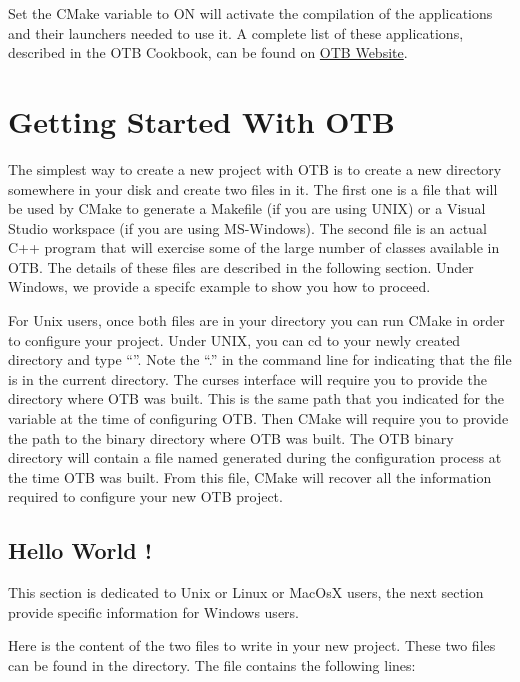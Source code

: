 Set the CMake variable  to ON will activate the compilation of the applications and their launchers needed to use it. A complete list of these applications, described in the OTB Cookbook, can be found on \href{http://orfeo-toolbox.org/Applications/index.html}{OTB Website}.


\section{Getting Started With OTB }
\label{sec:GettingStartedWithOTB}

The simplest way to create a new project with OTB is to create a new directory somewhere in your disk and create two files in it. The first one is a  file that will be used by CMake to generate a Makefile (if you are using UNIX) or a Visual Studio workspace (if you are using MS-Windows).  The second file is an actual C++ program that will exercise some of the large number of classes available in OTB. The details of these files are described in the following section. Under Windows, we provide a specifc example to show you how to proceed.  

For Unix users, once both files are in your directory you can run CMake in order to configure your project. Under UNIX, you can cd to your newly created directory and type ``''. Note the ``.'' in the command line for indicating that the  file is in the current directory. The curses interface will require you to provide the directory where OTB was built. This is the same path that you indicated for the  variable at the time of configuring OTB. Then CMake will require you to provide the path to the binary directory where OTB was built. The OTB binary directory will contain a file named  generated during the configuration process at the time OTB was built.  From this file, CMake will recover all the information required to configure your new OTB project.


\subsection{Hello World !}
\label{sec:HelloWorldOTB}

This section is dedicated to Unix or Linux or MacOsX users, the next section provide specific information for Windows users.


Here is the content of the two files to write in your new project. These two files can be found in the  directory. The  file contains the following lines:

